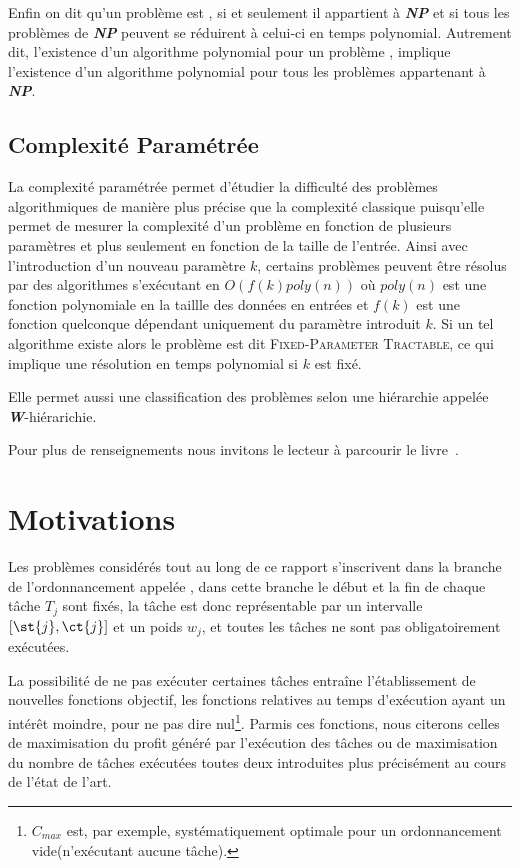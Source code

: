 \documentclass[a4paper,11pt]{report}
\begin{document}
Enfin on dit qu'un problème est \npc, si et seulement il appartient à \textit{\textbf{NP}} et si
tous les problèmes de \textit{\textbf{NP}} peuvent se réduirent à celui-ci en temps polynomial.
Autrement dit, l'existence d'un algorithme polynomial pour un problème \npc, implique l'existence
d'un algorithme polynomial pour tous les problèmes appartenant à \textit{\textbf{NP}}.

\subsection{Complexité Paramétrée}

La complexité paramétrée permet d'étudier la difficulté des problèmes algorithmiques de manière plus
précise que la complexité classique puisqu'elle permet de mesurer la complexité d'un problème en
fonction de plusieurs paramètres et plus seulement en fonction de la taille de l'entrée. Ainsi avec
l'introduction d'un nouveau paramètre $k$, certains problèmes peuvent être résolus par des algorithmes
s'exécutant en $O\left( f(k) poly(n) \right)$ où $poly(n)$ est une fonction polynomiale en la
taillle des données en entrées et $f(k)$ est une fonction quelconque dépendant uniquement du
paramètre introduit $k$. Si un tel algorithme existe alors le problème est dit
\textsc{Fixed-Parameter Tractable}, ce qui implique une résolution en temps polynomial si $k$ est
fixé.

Elle permet aussi une classification des problèmes \npc selon une hiérarchie appelée
\textit{\textbf{W}}-hiérarichie.

Pour plus de renseignements nous invitons le lecteur à parcourir le
livre~\cite{flum2006parameterized}.

\section{Motivations}

Les problèmes considérés tout au long de ce rapport s'inscrivent dans la branche de l'ordonnancement
appelée \isched{}, dans cette branche le début et la fin de chaque tâche $T_j$ sont
fixés, la tâche est donc représentable par un intervalle $\left[ \st{j}, \ct{j} \right]$ et un poids
$w_j$, et toutes les tâches ne sont pas obligatoirement exécutées.

La possibilité de ne pas exécuter certaines tâches entraîne l'établissement de nouvelles fonctions
objectif, les fonctions relatives au temps d'exécution ayant un intérêt moindre, pour ne pas dire
nul\footnote{$C_{max}$ est, par exemple, systématiquement optimale pour un ordonnancement
vide(n'exécutant aucune tâche).}. Parmis ces fonctions, nous citerons celles de maximisation du
profit généré par l'exécution des tâches ou de maximisation du nombre de tâches exécutées toutes
deux introduites plus précisément au cours de l'état de l'art. 
\end{document}
